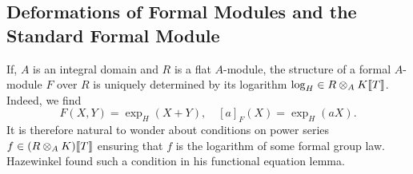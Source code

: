 \documentclass[../main.tex]{subfiles}
\begin{document}
\subsection{Deformations of Formal Modules and the Standard Formal Module} %
\label{sub:Deformations of Formal Modules and the Standard Formal Module}
If, $A$ is an integral domain and $R$ is a flat $A$-module, the structure of a formal
$A$-module $F$ over $R$ is uniquely determined by its logarithm $\log_H
\in R \otimes_A K \llbracket T \rrbracket$. Indeed, we find
\begin{equation*}
  F(X,Y) = \exp_H(X+Y), \quad [a]_F(X) = \exp_H(a X).
\end{equation*}
It is therefore natural to wonder about conditions on power series $f \in
(R\otimes_A K) \llbracket T \rrbracket$ ensuring that $f$ is the logarithm of some
formal group law. Hazewinkel found such a condition in his functional equation
lemma.
\end{document}
